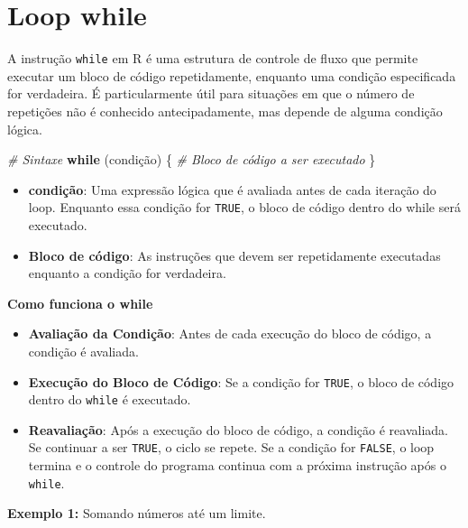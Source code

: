 \documentclass[
]{book}
\newenvironment{Shaded}{\begin{snugshade}}{\end{snugshade}}
\newcommand{\CommentTok}[1]{\textcolor[rgb]{0.56,0.35,0.01}{\textit{#1}}}
\newcommand{\ControlFlowTok}[1]{\textcolor[rgb]{0.13,0.29,0.53}{\textbf{#1}}}
\newcommand{\NormalTok}[1]{#1}
\begin{document}
\chapter{Loop while}\label{loop-while}

A instrução \texttt{while} em R é uma estrutura de controle de fluxo que permite executar um bloco de código repetidamente, enquanto uma condição especificada for verdadeira. É particularmente útil para situações em que o número de repetições não é conhecido antecipadamente, mas depende de alguma condição lógica.

\begin{Shaded}
\begin{Highlighting}[]
\CommentTok{\# Sintaxe}
\ControlFlowTok{while}\NormalTok{ (condição) \{}
  \CommentTok{\# Bloco de código a ser executado}
\NormalTok{\}}
\end{Highlighting}
\end{Shaded}

\begin{itemize}
\item
  \textbf{condição}: Uma expressão lógica que é avaliada antes de cada iteração do loop. Enquanto essa condição for \texttt{TRUE}, o bloco de código dentro do while será executado.
\item
  \textbf{Bloco de código}: As instruções que devem ser repetidamente executadas enquanto a condição for verdadeira.
\end{itemize}

\textbf{Como funciona o while}

\begin{itemize}
\item
  \textbf{Avaliação da Condição}: Antes de cada execução do bloco de código, a condição é avaliada.
\item
  \textbf{Execução do Bloco de Código}: Se a condição for \texttt{TRUE}, o bloco de código dentro do \texttt{while} é executado.
\item
  \textbf{Reavaliação}: Após a execução do bloco de código, a condição é reavaliada. Se continuar a ser \texttt{TRUE}, o ciclo se repete. Se a condição for \texttt{FALSE}, o loop termina e o controle do programa continua com a próxima instrução após o \texttt{while}.
\end{itemize}

\textbf{Exemplo 1:} Somando números até um limite.
\end{document}
